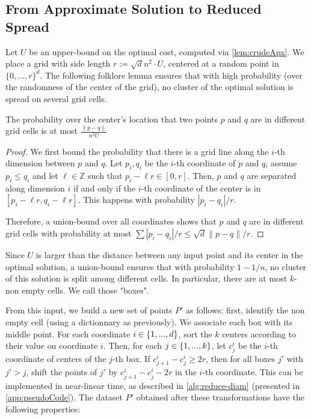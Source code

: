 \subsection{From Approximate Solution to Reduced Spread}
\label{ssec:reduce_spread}

Let $U$ be an upper-bound on the optimal cost, computed via \cref{lem:crudeApx}. We place a grid with side length $r:= \sqrt{d} n^2\cdot U$, centered at a random point in $\{0, ..., r\}^d$.
The following folklore lemma ensures that with high probability (over the randomness of the center of the grid), no cluster of the optimal solution is spread on several grid cells.

\begin{lemma}\label{lem:quadtreeSep}
The probability over the center's location that two points $p$ and $q$ are in different grid cells is at most $\frac{\|p-q\|}{n^2 U}$
\end{lemma}
\begin{proof}
We first bound the probability that there is a grid line along the $i$-th dimension between $p$ and $q$. Let $p_i, q_i$ be the $i$-th coordinate of $p$ and $q$, assume $p_i \leq q_i$ and let $\ell \in \mathbb{Z}$ such that $p_i - \ell r \in [0, r]$. 
Then, $p$ and $q$ are separated along dimension $i$ if and only if the $i$-th coordinate of the center is in $[p_i - \ell r, q_i - \ell r]$. This happens with probability $|p_i - q_i|/r$. 

Therefore, a union-bound over all coordinates shows that $p$ and $q$ are in different grid cells with probability at most $\sum |p_i-q_i| / r \leq \sqrt{d} \|p-q\|/r$.
\end{proof}

Since $U$ is larger than the distance between any input point and its center in the optimal solution, a union-bound ensures that with probability $1-1/n$, no
cluster of this solution is split among different cells.  In particular, there are at most $k$-non empty cells. We call those "boxes".

From this input, we build a new set of points $P'$ as follows: first, identify the non empty cell (using a dictionnary as previously). We associate each box
with its middle point.  For each coordinate $i \in \left\{ 1, ..., d \right\}$, sort the $k$ centers according to their value on coordinate $i$. Then, for each $j
\in \left\{ 1, ..., k\right\}$, let $c^i_j$  be the $i$-th coordinate of centers of the $j$-th box. If $c^i_{j+1} - c^i_j \geq 2r$, then for all boxes $j'$ with $j'
> j$, shift the points of $j'$ by $c^i_{j+1} - c^i_j - 2r$ in the $i$-th coordinate. This can be implemented in near-linear time, as described in
\cref{alg:reduce-diam} (presented in \cref{app:pseudoCode}). The dataset $P'$ obtained after these transformations have the following properties:

